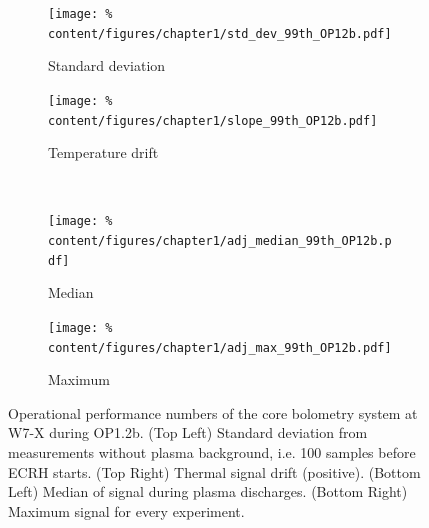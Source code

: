             \begin{figure}[t]%
                \begin{subfigure}{0.48\textwidth}%
                    \texttt{[image: \%
                        content/figures/chapter1/std\_dev\_99th\_OP12b.pdf]}%
                    \caption{Standard deviation}\label{fig:stat_stddev}%
                \end{subfigure}%
                \hfill%
                \begin{subfigure}{0.48\textwidth}%
                    \texttt{[image: \%
                        content/figures/chapter1/slope\_99th\_OP12b.pdf]}%
                    \caption{Temperature drift}\label{fig:stat_drift}%
                \end{subfigure}%
                \\%
                \begin{subfigure}{0.48\textwidth}%
                    \texttt{[image: \%
                        content/figures/chapter1/adj\_median\_99th\_OP12b.pdf]}%
                    \caption{Median}\label{fig:stat_median}%
                \end{subfigure}%
                \hfill%
                \begin{subfigure}{0.48\textwidth}%
                    \texttt{[image: \%
                        content/figures/chapter1/adj\_max\_99th\_OP12b.pdf]}%
                    \caption{Maximum}\label{fig:stat_maximum}%
                \end{subfigure}%
                \caption{Operational performance numbers of the core bolometry system at W7-X during OP1.2b. (Top Left) Standard deviation from measurements without plasma background, i.e. 100 samples before ECRH starts. (Top Right) Thermal signal drift (positive). (Bottom Left) Median of signal during plasma discharges. (Bottom Right) Maximum signal for every experiment.}\label{fig:opstatistics2}%
            \end{figure}%
%
